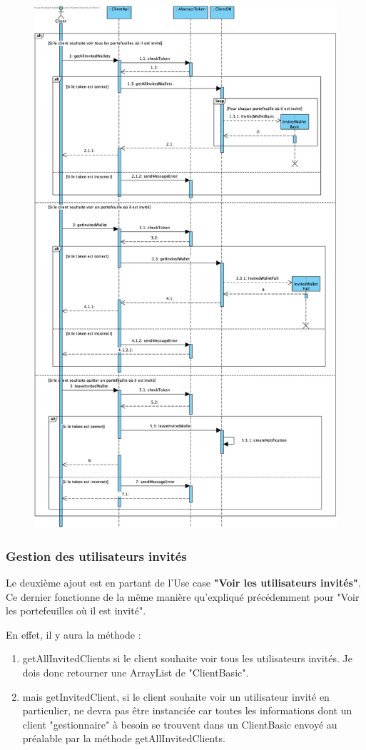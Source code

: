 \newpage
\begin{figure}[h]
\centering
\includegraphics[height = 1.2\textwidth]{Extension-claire/Sequence-claire/img/seqOuInvité.png}
\end{figure}

\newpage

\subsubsection{Gestion des utilisateurs invités}
\begin{flushleft}
Le deuxième ajout est en partant de l'Use case \textbf{"Voir les utilisateurs invités"}. Ce dernier fonctionne de la même manière qu'expliqué précédemment pour "Voir les portefeuilles où il est invité".
\end{flushleft}
\begin{flushleft}
En effet, il y aura la méthode : 
\end{flushleft}
\begin{enumerate}
\item getAllInvitedClients si le client souhaite voir tous les utilisateurs invités. Je dois donc retourner une ArrayList de "ClientBasic".
\item mais getInvitedClient, si le client souhaite voir un utilisateur invité en particulier, ne devra pas être instanciée car toutes les informations dont un client "gestionnaire" à besoin se trouvent dans un ClientBasic envoyé au préalable par la méthode getAllInvitedClients.
\end{enumerate}

